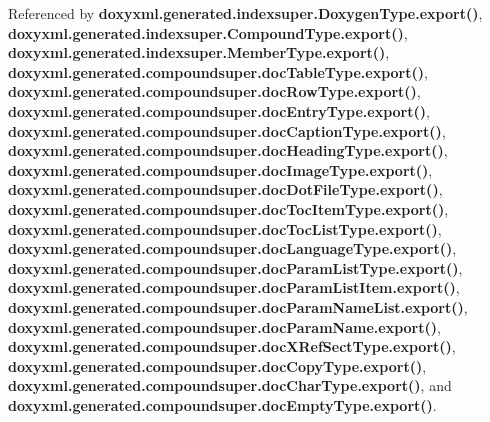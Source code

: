 Referenced by {\bf doxyxml.\+generated.\+indexsuper.\+Doxygen\+Type.\+export()}, {\bf doxyxml.\+generated.\+indexsuper.\+Compound\+Type.\+export()}, {\bf doxyxml.\+generated.\+indexsuper.\+Member\+Type.\+export()}, {\bf doxyxml.\+generated.\+compoundsuper.\+doc\+Table\+Type.\+export()}, {\bf doxyxml.\+generated.\+compoundsuper.\+doc\+Row\+Type.\+export()}, {\bf doxyxml.\+generated.\+compoundsuper.\+doc\+Entry\+Type.\+export()}, {\bf doxyxml.\+generated.\+compoundsuper.\+doc\+Caption\+Type.\+export()}, {\bf doxyxml.\+generated.\+compoundsuper.\+doc\+Heading\+Type.\+export()}, {\bf doxyxml.\+generated.\+compoundsuper.\+doc\+Image\+Type.\+export()}, {\bf doxyxml.\+generated.\+compoundsuper.\+doc\+Dot\+File\+Type.\+export()}, {\bf doxyxml.\+generated.\+compoundsuper.\+doc\+Toc\+Item\+Type.\+export()}, {\bf doxyxml.\+generated.\+compoundsuper.\+doc\+Toc\+List\+Type.\+export()}, {\bf doxyxml.\+generated.\+compoundsuper.\+doc\+Language\+Type.\+export()}, {\bf doxyxml.\+generated.\+compoundsuper.\+doc\+Param\+List\+Type.\+export()}, {\bf doxyxml.\+generated.\+compoundsuper.\+doc\+Param\+List\+Item.\+export()}, {\bf doxyxml.\+generated.\+compoundsuper.\+doc\+Param\+Name\+List.\+export()}, {\bf doxyxml.\+generated.\+compoundsuper.\+doc\+Param\+Name.\+export()}, {\bf doxyxml.\+generated.\+compoundsuper.\+doc\+X\+Ref\+Sect\+Type.\+export()}, {\bf doxyxml.\+generated.\+compoundsuper.\+doc\+Copy\+Type.\+export()}, {\bf doxyxml.\+generated.\+compoundsuper.\+doc\+Char\+Type.\+export()}, and {\bf doxyxml.\+generated.\+compoundsuper.\+doc\+Empty\+Type.\+export()}.



